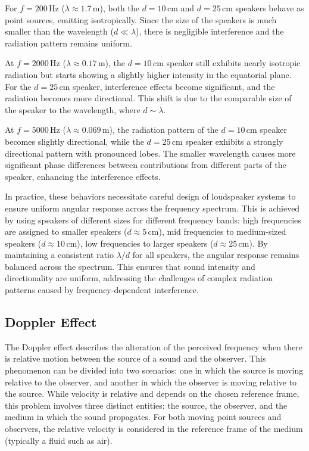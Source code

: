 \documentclass[a4paper]{article}
\begin{document}
For \( f = 200 \, \text{Hz} \) (\( \lambda \approx 1.7 \, \text{m} \)), both the \( d = 10 \, \text{cm} \) and \( d = 25 \, \text{cm} \) speakers behave as point sources, emitting isotropically. Since the size of the speakers is much smaller than the wavelength (\( d \ll \lambda \)), there is negligible interference and the radiation pattern remains uniform.

At \( f = 2000 \, \text{Hz} \) (\( \lambda \approx 0.17 \, \text{m} \)), the \( d = 10 \, \text{cm} \) speaker still exhibits nearly isotropic radiation but starts showing a slightly higher intensity in the equatorial plane. For the \( d = 25 \, \text{cm} \) speaker, interference effects become significant, and the radiation becomes more directional. This shift is due to the comparable size of the speaker to the wavelength, where \( d \sim \lambda \).

At \( f = 5000 \, \text{Hz} \) (\( \lambda \approx 0.069 \, \text{m} \)), the radiation pattern of the \( d = 10 \, \text{cm} \) speaker becomes slightly directional, while the \( d = 25 \, \text{cm} \) speaker exhibits a strongly directional pattern with pronounced lobes. The smaller wavelength causes more significant phase differences between contributions from different parts of the speaker, enhancing the interference effects.


In practice, these behaviors necessitate careful design of loudspeaker systems to ensure uniform angular response across the frequency spectrum. This is achieved by using speakers of different sizes for different frequency bands:
high frequencies are assigned to smaller speakers (\( d \approx 5 \, \text{cm} \)),
mid frequencies to medium-sized speakers (\( d \approx 10 \, \text{cm} \)),
low frequencies to larger speakers (\( d \approx 25 \, \text{cm} \)). By maintaining a consistent ratio \( \lambda / d \) for all speakers, the angular response remains balanced across the spectrum. This ensures that sound intensity and directionality are uniform, addressing the challenges of complex radiation patterns caused by frequency-dependent interference.

\subsection {Doppler Effect}

The Doppler effect describes the alteration of the perceived frequency when there is relative motion between the source of a sound and the observer. This phenomenon can be divided into two scenarios: one in which the source is moving relative to the observer, and another in which the observer is moving relative to the source. While velocity is relative and depends on the chosen reference frame, this problem involves three distinct entities: the source, the observer, and the medium in which the sound propagates. For both moving point sources and observers, the relative velocity is considered in the reference frame of the medium (typically a fluid such as air).
\end{document}
